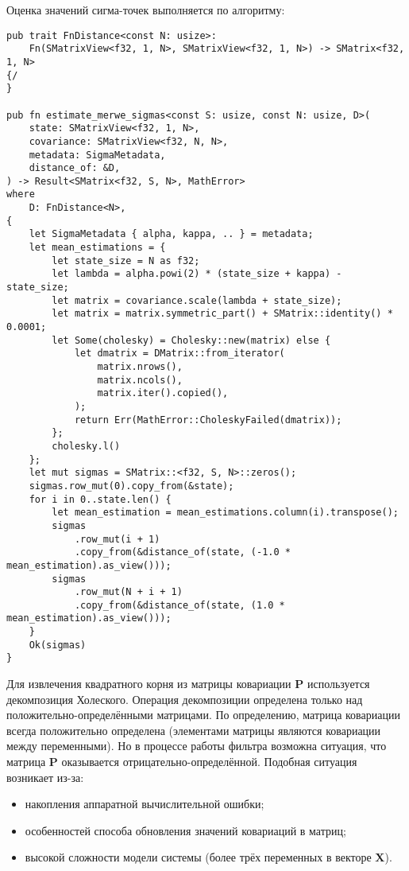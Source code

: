 Оценка значений сигма-точек выполняется по алгоритму:
\begin{lstlisting}
pub trait FnDistance<const N: usize>:
    Fn(SMatrixView<f32, 1, N>, SMatrixView<f32, 1, N>) -> SMatrix<f32, 1, N>
{/
}

pub fn estimate_merwe_sigmas<const S: usize, const N: usize, D>(
    state: SMatrixView<f32, 1, N>,
    covariance: SMatrixView<f32, N, N>,
    metadata: SigmaMetadata,
    distance_of: &D,
) -> Result<SMatrix<f32, S, N>, MathError>
where
    D: FnDistance<N>,
{
    let SigmaMetadata { alpha, kappa, .. } = metadata;
    let mean_estimations = {
        let state_size = N as f32;
        let lambda = alpha.powi(2) * (state_size + kappa) - state_size;
        let matrix = covariance.scale(lambda + state_size);
        let matrix = matrix.symmetric_part() + SMatrix::identity() * 0.0001;
        let Some(cholesky) = Cholesky::new(matrix) else {
            let dmatrix = DMatrix::from_iterator(
                matrix.nrows(),
                matrix.ncols(),
                matrix.iter().copied(),
            );
            return Err(MathError::CholeskyFailed(dmatrix));
        };
        cholesky.l()
    };
    let mut sigmas = SMatrix::<f32, S, N>::zeros();
    sigmas.row_mut(0).copy_from(&state);
    for i in 0..state.len() {
        let mean_estimation = mean_estimations.column(i).transpose();
        sigmas
            .row_mut(i + 1)
            .copy_from(&distance_of(state, (-1.0 * mean_estimation).as_view()));
        sigmas
            .row_mut(N + i + 1)
            .copy_from(&distance_of(state, (1.0 * mean_estimation).as_view()));
    }
    Ok(sigmas)
}

\end{lstlisting}
Для извлечения квадратного корня из матрицы ковариации $\mathbf{P}$
используется декомпозиция Холеского. Операция декомпозиции 
определена только над положительно-определёнными матрицами. По определению,
матрица ковариации всегда положительно определена (элементами матрицы являются ковариации
между переменными). Но в процессе работы фильтра возможна ситуация,
что матрица $\mathbf{P}$ оказывается отрицательно-определённой.
Подобная ситуация возникает из-за:
\begin{itemize}
    \item накопления аппаратной вычислительной ошибки;
    \item особенностей способа обновления значений ковариаций в матриц;
    \item высокой сложности модели системы (более трёх переменных в векторе $\mathbf{X}$).
\end{itemize}


